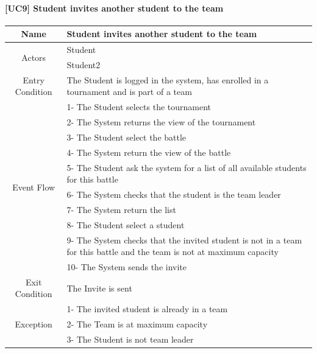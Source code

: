 \documentclass{article}
\begin{document}
\paragraph{[UC9] Student invites another student to the team}
\begin{center}
\begin{tabular}{|c|m{40em}|}
\hline
Name & Student invites another student to the team\\
\hline
\multirow{2}{4em}{Actors}
& Student\\
& Student2\\
\hline
Entry Condition & The Student is logged in the system, has enrolled in a tournament and is part of a team\\
\hline
\multirow{10}{4em}{Event Flow}
& 1- The Student selects the tournament\\
& 2- The System returns the view of the tournament\\
& 3- The Student select the battle\\
& 4- The System return the view of the battle\\
& 5- The Student ask the system for a list of all available students for this battle\\
& 6- The System checks that the student is the team leader\\
& 7- The System return the list\\
& 8- The Student select a student\\
& 9- The System checks that the invited student is not in a team for this battle and the team is not at maximum capacity\\
& 10- The System sends the invite\\
\hline
Exit Condition & The Invite is sent\\
\hline
\multirow{3}{4em}{Exception}
& 1- The invited student is already in a team\\
& 2- The Team is at maximum capacity\\
& 3- The Student is not team leader\\
\hline
\end{tabular}
\end{center}
\end{document}
